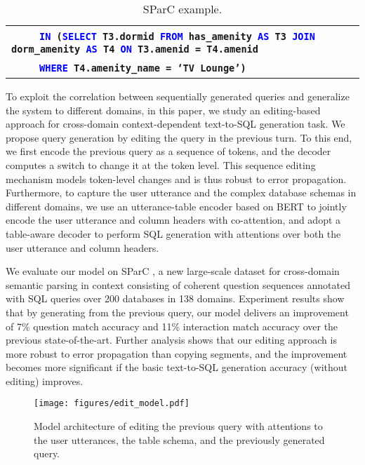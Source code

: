 \documentclass[11pt,a4paper]{article}
\newcommand{\keyword}[1]{\textcolor{blue}{#1}}
\newcommand{\sql}[1]{\textbf{\texttt{#1}}}
\begin{document}
\begin{table*}[t!]
\begin{tabular}{|p{\textwidth}|}
\vspace{-.18in}
~~~~~\scriptsize{\sql{\keyword{IN} (\keyword{SELECT} T3.dormid \keyword{FROM} has\_amenity \keyword{AS} T3 \keyword{JOIN} dorm\_amenity \keyword{AS} T4 \keyword{ON} T3.amenid = T4.amenid}}\\
\vspace{-.24in}
~~~~~\scriptsize{\sql{\keyword{WHERE} T4.amenity\_name = `TV Lounge')}}\\
\hline
\end{tabular}
\caption{SParC example.}
\vspace{-3mm}
\label{tab:sparc_example}
\end{table*}

To exploit the correlation between sequentially generated queries and generalize the system to different domains, in this paper, we study an editing-based approach for cross-domain context-dependent text-to-SQL generation task.
We propose query generation by editing the query in the previous turn.
To this end, we first encode the previous query as a sequence of tokens, and the decoder computes a switch to change it at the token level.
This sequence editing mechanism models token-level changes and is thus robust to error propagation.
Furthermore, to capture the user utterance and the complex database schemas in different domains, we use an utterance-table encoder based on BERT to jointly encode the user utterance and column headers with co-attention, and adopt a table-aware decoder to perform SQL generation with attentions over both the user utterance and column headers.

We evaluate our model on SParC \cite{yu2019sparc}, a new large-scale dataset for cross-domain semantic parsing in context consisting of coherent question sequences annotated with SQL queries over 200 databases in 138 domains.
Experiment results show that by generating from the previous query, our model delivers an improvement of 7\% question match accuracy and 11\% interaction match accuracy over the previous state-of-the-art.
Further analysis shows that our editing approach is more robust to error propagation than copying segments, and the improvement becomes more significant if the basic text-to-SQL generation accuracy (without editing) improves.

\begin{figure*}[t!]
  \centering
  \texttt{[image: figures/edit\_model.pdf]}
  \caption{Model architecture of editing the previous query with attentions to the user utterances, the table schema, and the previously generated query.}
  \label{fig:edit_model}
\end{figure*}
\end{document}
